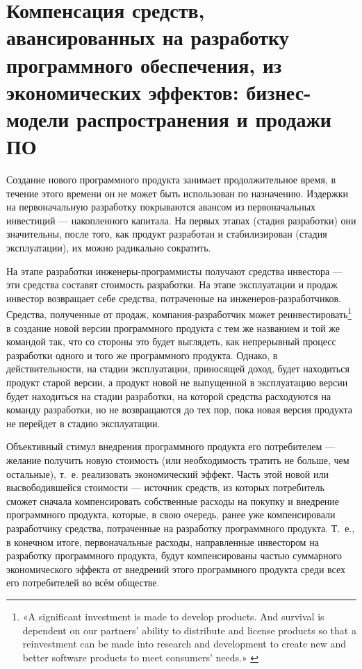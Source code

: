\documentclass{article}
\begin{document}
\section*{Компенсация средств, авансированных на разработку программного обеспечения, из экономических эффектов: бизнес-модели распространения и продажи ПО}

Создание нового программного продукта занимает продолжительное время, в течение этого времени он не может быть использован по назначению. Издержки на первоначальную разработку покрываются авансом из первоначальных инвестиций — накопленного капитала. На первых этапах (стадия разработки) они значительны, после того, как продукт разработан и стабилизирован (стадия эксплуатации), их можно радикально сократить.

На этапе разработки инженеры-программисты получают средства инвестора — эти средства составят стоимость разработки. На этапе эксплуатации и продаж инвестор возвращает себе средства, потраченные на инженеров-разработчиков. Средства, полученные от продаж, компания-разработчик может реинвестировать\footnote{«A significant investment is made to develop products. And survival is dependent on our partners’ ability to distribute and license products so that a reinvestment can be made into research and development to create new and better software products to meet consumers’ needs.» \cite{microsoftPiracyReinvest}} в создание новой версии программного продукта с тем же названием и той же командой так, что со стороны это будет выглядеть, как непрерывный процесс разработки одного и того же программного продукта. Однако, в действительности, на стадии эксплуатации, приносящей доход, будет находиться продукт старой версии, а продукт новой не выпущенной в эксплуатацию версии будет находиться на стадии разработки, на которой средства расходуются на команду разработки, но не возвращаются до тех пор, пока новая версия продукта не перейдет в стадию эксплуатации.

Объективный стимул внедрения программного продукта его потребителем — желание получить новую стоимость (или необходимость тратить не больше, чем остальные), т.~е. реализовать экономический эффект. Часть этой новой или высвободившейся стоимости — источник средств, из которых потребитель сможет сначала компенсировать собственные расходы на покупку и внедрение программного продукта, которые, в свою очередь, ранее уже компенсировали разработчику средства, потраченные на разработку программного продукта. Т.~е., в конечном итоге, первоначальные расходы, направленные инвестором на разработку программного продукта, будут компенсированы частью суммарного экономического эффекта от внедрений этого программного продукта среди всех его потребителей во всём обществе.
\end{document}
